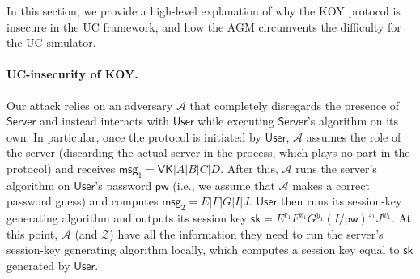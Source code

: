 \documentclass[12pt,a4paper]{article}
\newcommand{\env}{\mathcal{Z}}
\newcommand{\adv}{\mathcal{A}}
\newcommand{\user}{\mathsf{User}}
\newcommand{\sk}{\mathsf{sk}}
\newcommand{\pw}{\mathsf{pw}}
\newcommand{\server}{\mathsf{Server}}
\newcommand{\msg}[1]{\mathsf{msg}_{#1}}
\begin{document}
In this section, we provide a high-level explanation of why the KOY protocol is insecure in the UC framework, and how the AGM circumvents the difficulty for the UC simulator.

	\paragraph{UC-insecurity of KOY.}
	Our attack relies on an adversary $\adv$ that completely disregards the presence of $\server$ and instead interacts with $\user$ while executing $\server$'s algorithm on its own. In particular, once the protocol is initiated by $\user$, $\adv$ assumes the role of the server (discarding the actual server in the process, which plays no part in the protocol) and receives $\msg{1} = \mathsf{VK}|A|B|C|D$. After this, $\adv$ runs the server's algorithm on $\user$'s password $\pw$ (i.e., we assume that $\adv$ makes a correct password guess) and computes $\msg{2} = E|F|G|I|J$. $\user$ then runs its session-key generating algorithm and outputs its session key $\sk = E^{r_1}F^{x_1}G^{y_1}(I/\pw)^{z_1}J^{w_1}$. At this point, $\adv$ (and $\env$) have all the information they need to run the server's session-key generating algorithm locally, which computes a session key equal to $\sk$ generated by $\user$.\\
	
\end{document}
